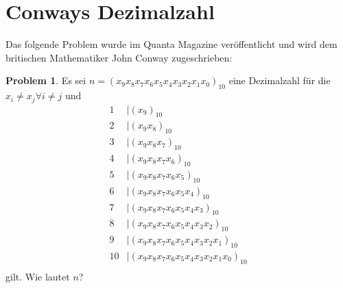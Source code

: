 \documentclass{article}
\theoremstyle{plain} %
\theoremstyle{definition} %
\newtheorem{problem}[theorem]{Problem}
\begin{document}
\section{Conways Dezimalzahl}
Das folgende Problem wurde im Quanta Magazine\cite{QuantaConway} veröffentlicht und wird dem britischen Mathematiker John Conway zugeschrieben:
\begin{problem}
Es sei $n = (x_9x_8x_7x_6x_5x_4x_3x_2x_1x_0)_{10}$ eine Dezimalzahl für die $x_i \neq x_j \forall i \neq j$ und
\begin{align*}
  1  & | (x_9         )_{10}                   \\
  2  & | (x_9x_8        )_{10}                 \\
  3  & | (x_9x_8x_7       )_{10}               \\
  4  & | (x_9x_8x_7x_6     )_{10}              \\
  5  & | (x_9x_8x_7x_6x_5     )_{10}           \\
  6  & | (x_9x_8x_7x_6x_5x_4    )_{10}         \\
  7  & | (x_9x_8x_7x_6x_5x_4x_3   )_{10}       \\
  8  & | (x_9x_8x_7x_6x_5x_4x_3x_2  )_{10}     \\
  9  & | (x_9x_8x_7x_6x_5x_4x_3x_2x_1 )_{10}   \\
  10 & | (x_9x_8x_7x_6x_5x_4x_3x_2x_1x_0)_{10} \\
\end{align*}
gilt. Wie lautet $n$?
\end{problem}
\end{document}
